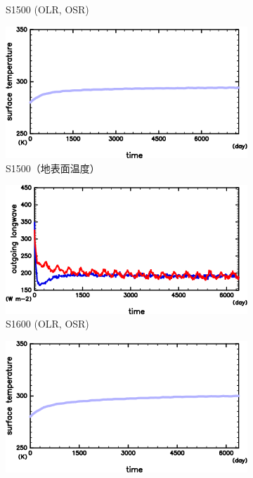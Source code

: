 \documentclass[body]{subfiles}
\begin{document}
\begin{figure}[t]
\begin{subfigure}{.4\textwidth}
		\caption{S1500 (OLR, OSR)}\label{S1500_OLRA}
	\end{subfigure}
	\begin{subfigure}{.4\textwidth}
		\centering
		\includegraphics[width=\columnwidth]{S1500/S1500_SurfTemp_horimean_time0.0-7300.0-crop.png}
		\caption{S1500（地表面温度）}\label{S1500_SurfTemp}
	\end{subfigure}
	\begin{subfigure}{.4\textwidth}
		\centering
		\includegraphics[width=\columnwidth]{S1600/S1600_OLRA-OSRA_horimean_time0.0-7300.0-crop.png}
		\caption{S1600 (OLR, OSR)}\label{S1600_OLRA}
	\end{subfigure}
	\begin{subfigure}{.4\textwidth}
		\centering
		\includegraphics[width=\columnwidth]{S1600/S1600_SurfTemp_horimean_time0.0-7300.0-crop.png}

\end{subfigure}
\end{figure}
\end{document}
